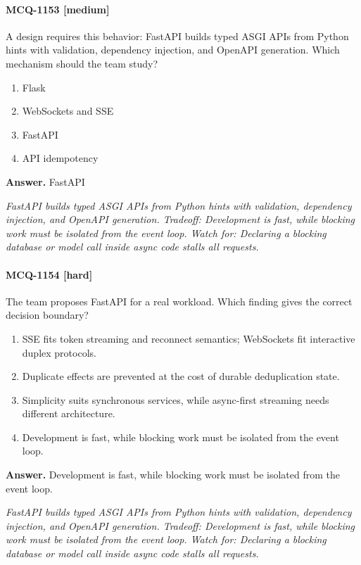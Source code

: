 \paragraph{MCQ-1153 [medium]} A design requires this behavior: FastAPI builds typed ASGI APIs from Python hints with validation, dependency injection, and OpenAPI generation. Which mechanism should the team study?
\begin{enumerate}[label=\Alph*.]
\item Flask
\item WebSockets and SSE
\item FastAPI
\item API idempotency
\end{enumerate}
\noindent\textbf{Answer.} FastAPI
\par\textit{FastAPI builds typed ASGI APIs from Python hints with validation, dependency injection, and OpenAPI generation. Tradeoff: Development is fast, while blocking work must be isolated from the event loop. Watch for: Declaring a blocking database or model call inside async code stalls all requests.}
\paragraph{MCQ-1154 [hard]} The team proposes FastAPI for a real workload. Which finding gives the correct decision boundary?
\begin{enumerate}[label=\Alph*.]
\item SSE fits token streaming and reconnect semantics; WebSockets fit interactive duplex protocols.
\item Duplicate effects are prevented at the cost of durable deduplication state.
\item Simplicity suits synchronous services, while async-first streaming needs different architecture.
\item Development is fast, while blocking work must be isolated from the event loop.
\end{enumerate}
\noindent\textbf{Answer.} Development is fast, while blocking work must be isolated from the event loop.
\par\textit{FastAPI builds typed ASGI APIs from Python hints with validation, dependency injection, and OpenAPI generation. Tradeoff: Development is fast, while blocking work must be isolated from the event loop. Watch for: Declaring a blocking database or model call inside async code stalls all requests.}
